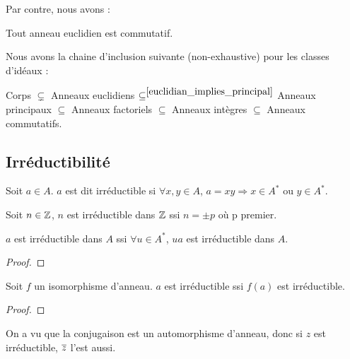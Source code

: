 Par contre, nous avons :
\begin{proposition}
	Tout anneau euclidien est commutatif.
\end{proposition}

Nous avons la chaine d'inclusion suivante (non-exhaustive) pour les classes
d'idéaux :
\begin{theorem}
	Corps 
	$\displaystyle \subsetneq$ Anneaux euclidiens
	$\displaystyle \subseteq^{\ref{euclidian_implies_principal}}$ Anneaux principaux
	$\subseteq$ Anneaux factoriels $\subseteq$ Anneaux intègres $\subseteq$
	Anneaux commutatifs.
	\label{ideal_class}
\end{theorem}

\subsection{Irréductibilité}

\begin{definition} 
	Soit $a \in A$. $a$ est dit irréductible si $\forall x, y \in A$, $a = xy
	\Rightarrow x \in A^{*}$ ou $y \in A^{*}$.
	\label{irreductible_element}
\end{definition}

\begin{exemple}
	Soit $n \in \mathbb{Z}$, $n$ est irréductible dans $\mathbb{Z}$ ssi $n = \pm p$
	où p premier.
\end{exemple}

\begin{proposition}
	$a$ est irréductible dans $A$ ssi $\forall u \in A^{*}$, $ua$ est
	irréductible dans $A$.
\end{proposition}

\begin{proof}
	
\end{proof}

\begin{proposition}
	Soit $f$ un isomorphisme d'anneau. $a$ est irréductible ssi $f(a)$ est
	irréductible.
\end{proposition}

\begin{proof}
	
\end{proof}

\begin{exemple}
	On a vu que la conjugaison est un automorphisme d'anneau, donc si $z$ est
	irréductible, $\overline{z}$ l'est aussi.
\end{exemple}

